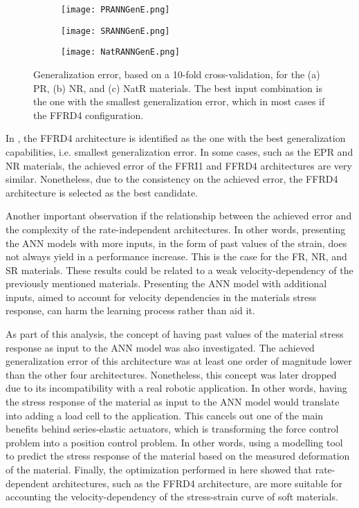 \newpage

\begin{figure}[htbp!]
	\centering
	\begin{subfigure}[b]{0.49\textwidth}
		\centering
		\texttt{[image: PRANNGenE.png]}
		\caption{}
		\label{fig:ANNGenPR}
	\end{subfigure}
	\begin{subfigure}[b]{0.49\textwidth}
		\centering
		\texttt{[image: SRANNGenE.png]}
		\caption{}
		\label{fig:ANNGenSR}
	\end{subfigure}
	\begin{subfigure}[b]{0.49\textwidth}
		\centering
		\texttt{[image: NatRANNGenE.png]}
		\caption{}
		\label{fig:ANNGenNatR}
	\end{subfigure}
	\caption{Generalization error, based on a 10-fold cross-validation, for the (a) PR, (b) NR, and (c) NatR materials. The best input combination is the one with the smallest generalization error, which in most cases if the FFRD4 configuration.}
	\label{fig:ANNGen3}
\end{figure}

In , the FFRD4 architecture is identified as the one with the best generalization capabilities, i.e. smallest generalization error. In some cases, such as the EPR and NR materials, the achieved error of the FFRI1 and FFRD4 architectures are very similar. Nonetheless, due to the consistency on the achieved error, the FFRD4 architecture is selected as the best candidate.

Another important observation if the relationship between the achieved error and the complexity of the rate-independent architectures. In other words, presenting the ANN models with more inputs, in the form of past values of the strain, does not always yield in a performance increase. This is the case for the FR, NR, and SR materials. These results could be related to a weak velocity-dependency of the previously mentioned materials. Presenting the ANN model with additional inputs, aimed to account for velocity dependencies in the materials stress response, can harm the learning process rather than aid it.

As part of this analysis, the concept of having past values of the material stress response as input to the ANN model was also investigated. The achieved generalization error of this architecture was at least one order of magnitude lower than the other four architectures. Nonetheless, this concept was later dropped due to its incompatibility with a real robotic application. In other words, having the stress response of the material as input to the ANN model would translate into adding a load cell to the application. This cancels out one of the main benefits behind series-elastic actuators, which is transforming the force control problem into a position control problem. In other words, using a modelling tool to predict the stress response of the material based on the measured deformation of the material. Finally, the optimization performed in here showed that rate-dependent architectures, such as the FFRD4 architecture, are more suitable for accounting the velocity-dependency of the stress-strain curve of soft materials.

